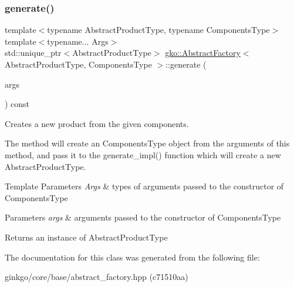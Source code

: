 \subsubsection{\texorpdfstring{generate()}{generate()}}
{\footnotesize\ttfamily template$<$typename Abstract\+Product\+Type, typename Components\+Type$>$ \\
template$<$typename... Args$>$ \\
std\+::unique\+\_\+ptr$<$Abstract\+Product\+Type$>$ \hyperlink{classgko_1_1AbstractFactory}{gko\+::\+Abstract\+Factory}$<$ Abstract\+Product\+Type, Components\+Type $>$\+::generate (\begin{DoxyParamCaption}\item[{Args \&\&...}]{args }\end{DoxyParamCaption}) const\hspace{0.3cm}{\ttfamily [inline]}}



Creates a new product from the given components. 

The method will create an Components\+Type object from the arguments of this method, and pass it to the generate\+\_\+impl() function which will create a new Abstract\+Product\+Type.


\begin{DoxyTemplParams}{Template Parameters}
{\em Args} & types of arguments passed to the constructor of Components\+Type\\
\hline
\end{DoxyTemplParams}

\begin{DoxyParams}{Parameters}
{\em args} & arguments passed to the constructor of Components\+Type\\
\hline
\end{DoxyParams}
\begin{DoxyReturn}{Returns}
an instance of Abstract\+Product\+Type 
\end{DoxyReturn}


The documentation for this class was generated from the following file\+:\begin{DoxyCompactItemize}
\item 
ginkgo/core/base/abstract\+\_\+factory.\+hpp (c71510aa)\end{DoxyCompactItemize}
